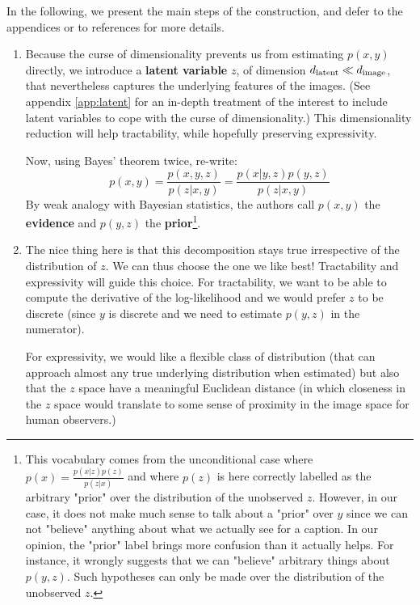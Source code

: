 \documentclass{article}
\begin{document}
\begin{multicols}{2}
In the following, we present the main steps of the construction, and defer to the appendices or to references for more details.

\begin{enumerate}

    \item Because the curse of dimensionality prevents us from estimating $p(x,y)$ directly, we introduce a \textbf{latent variable} $z$, of dimension ${d_{\mathrm{latent}}} \ll d_{\mathrm{image}}$, that nevertheless captures the underlying features of the images.
    (See appendix \ref{app:latent} for an in-depth treatment of the interest to include latent variables to cope with the curse of dimensionality.)
    This dimensionality reduction will help tractability, while hopefully preserving expressivity.
    
    Now, using Bayes' theorem twice, re-write: $$p(x,y)=\frac{p(x,y,z)}{p(z|x,y)}=\frac{p(x|y,z)p(y,z)}{p(z|x,y)}$$
    By weak analogy with Bayesian statistics, the authors call $p(x,y)$ the \textbf{evidence} and $p(y,z)$ the \textbf{prior}\footnote{
    This vocabulary comes from the unconditional case where $p(x)=\frac{p(x|z)p(z)}{p(z|x)}$ and where $p(z)$ is here correctly labelled as the arbitrary "prior" over the distribution of the unobserved $z$.
    However, in our case, it does not make much sense to talk about a "prior" over $y$ since we can not "believe" anything about what we actually see for a caption. In our opinion, the "prior" label brings more confusion than it actually helps. For instance, it wrongly suggests that we can "believe" arbitrary things about $p(y,z)$. Such hypotheses can only be made over the distribution of the unobserved $z$.
    }.
    
    \item The nice thing here is that this decomposition stays true irrespective of the distribution of $z$.
    We can thus choose the one we like best!
    Tractability and expressivity will guide this choice. For tractability, we want to be able to compute the derivative of the log-likelihood and we would prefer $z$ to be discrete (since $y$ is discrete and we need to estimate $p(y,z)$ in the numerator).
    
    For expressivity, we would like a flexible class of distribution (that can approach almost any true underlying distribution when estimated) but also that the $z$ space have a meaningful Euclidean distance (in which closeness in the $z$ space would translate to some sense of proximity in the image space for human observers.)
    

\end{enumerate}
\end{multicols}
\end{document}
